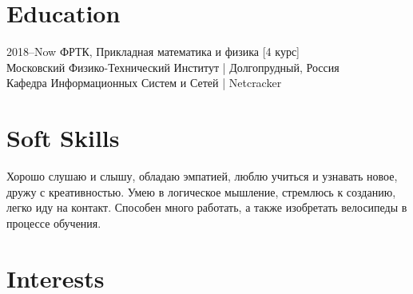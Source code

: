 \documentclass[]{cv-style}          %
\begin{document}

\section{Education}

\begin{entrylist}
\entry
{2018--Now}
{{\normalfont ФРТК, Прикладная математика и физика [4 курс]}}
{\\Московский Физико-Технический Институт  |  Долгопрудный, Россия \\Кафедра Информационных Систем и Сетей | Netcracker}
{\vspace{-0.3cm}}
\end{entrylist}


\section{Soft Skills}
  \vspace{-0.4cm}
Хорошо слушаю и слышу, обладаю эмпатией, люблю учиться и узнавать новое, дружу с креативностью. Умею в логическое мышление, стремлюсь к созданию, легко иду на контакт. Способен много работать, а также изобретать велосипеды в процессе обучения.


\section{Interests}
\end{document}
